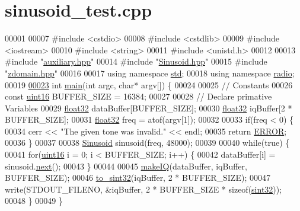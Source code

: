 \hypertarget{sinusoid__test_8cpp_source}{\section{sinusoid\+\_\+test.\+cpp}
\label{sinusoid__test_8cpp_source}
}

\begin{DoxyCode}
00001 
00007 \textcolor{preprocessor}{#include <cstdio>}
00008 \textcolor{preprocessor}{#include <cstdlib>}
00009 \textcolor{preprocessor}{#include <iostream>}
00010 \textcolor{preprocessor}{#include <string>}
00011 \textcolor{preprocessor}{#include <unistd.h>}
00012 
00013 \textcolor{preprocessor}{#include "\hyperlink{auxiliary_8hpp}{auxiliary.hpp}"}
00014 \textcolor{preprocessor}{#include "\hyperlink{Sinusoid_8hpp}{Sinusoid.hpp}"}
00015 \textcolor{preprocessor}{#include "\hyperlink{zdomain_8hpp}{zdomain.hpp}"}
00016 
00017 \textcolor{keyword}{using namespace }\hyperlink{namespacestd}{std};
00018 \textcolor{keyword}{using namespace }\hyperlink{namespaceradio}{radio};
00019 
\hypertarget{sinusoid__test_8cpp_source_l00023}{}\hyperlink{sinusoid__test_8cpp_a0ddf1224851353fc92bfbff6f499fa97}{00023} \textcolor{keywordtype}{int} \hyperlink{sinusoid__test_8cpp_a0ddf1224851353fc92bfbff6f499fa97}{main}(\textcolor{keywordtype}{int} argc, \textcolor{keywordtype}{char}* argv[]) \{
00024 
00025     \textcolor{comment}{// Constants}
00026     \textcolor{keyword}{const} \hyperlink{definitions_8hpp_a05f6b0ae8f6a6e135b0e290c25fe0e4e}{uint16} BUFFER\_SIZE = 16384;
00027 
00028     \textcolor{comment}{// Declare primative Variables}
00029     \hyperlink{definitions_8hpp_aacdc525d6f7bddb3ae95d5c311bd06a1}{float32} dataBuffer[BUFFER\_SIZE];
00030     \hyperlink{definitions_8hpp_aacdc525d6f7bddb3ae95d5c311bd06a1}{float32} iqBuffer[2 * BUFFER\_SIZE];
00031     \hyperlink{definitions_8hpp_aacdc525d6f7bddb3ae95d5c311bd06a1}{float32} freq = atof(argv[1]);
00032 
00033     \textcolor{keywordflow}{if}(freq < 0) \{
00034         cerr << \textcolor{stringliteral}{"The given tone was invalid."} << endl;
00035         \textcolor{keywordflow}{return} \hyperlink{definitions_8hpp_a8fe83ac76edc595f6b98cd4a4127aed5}{ERROR};
00036     \}
00037 
00038     \hyperlink{classradio_1_1Sinusoid}{Sinusoid} sinusoid(freq, 48000);
00039 
00040     \textcolor{keywordflow}{while}(\textcolor{keyword}{true}) \{
00041         \textcolor{keywordflow}{for}(\hyperlink{definitions_8hpp_a05f6b0ae8f6a6e135b0e290c25fe0e4e}{uint16} i = 0; i < BUFFER\_SIZE; i++) \{
00042             dataBuffer[i] = sinusoid.\hyperlink{classradio_1_1Sinusoid_aab44298ea1bd5cb175d5826243cf56f2}{next}();
00043         \}
00044         
00045         \hyperlink{namespaceradio_a7166522e76ff88e8d482491b1b6e2275}{makeIQ}(dataBuffer, iqBuffer, BUFFER\_SIZE);
00046         \hyperlink{namespaceradio_ae4b2334c4366dcdf0311ad79d2067945}{to\_sint32}(iqBuffer, 2 * BUFFER\_SIZE);
00047         write(STDOUT\_FILENO, &iqBuffer, 2 * BUFFER\_SIZE * \textcolor{keyword}{sizeof}(\hyperlink{definitions_8hpp_a0573de65958b4fda3a0460ed417dafb8}{sint32}));
00048     \}
00049 \}
\end{DoxyCode}

